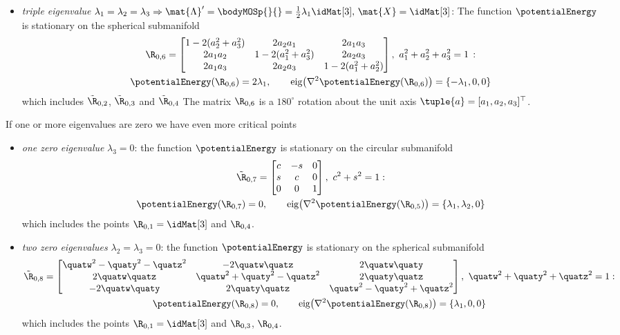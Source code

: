 \begin{Example}
\begin{itemize}
\item \textit{triple eigenvalue} $\lambda_1 = \lambda_2 = \lambda_3 \Rightarrow \mat{\Lambda}' = \bodyMOSp{}{} = \tfrac{1}{2} \lambda_1 \idMat[3], \, \mat{X} = \idMat[3]$:
The function $\potentialEnergy$ is stationary on the spherical submanifold
\begin{multline*}
 \R_{0,6} =
 \begin{bmatrix}
  1 - 2(a_2^2 + a_3^2) & 2 a_2 a_1 & 2 a_1 a_3 \\
  2 a_1 a_2 & 1 - 2(a_1^2 + a_3^2) & 2 a_2 a_3 \\
  2 a_1 a_3 & 2 a_2 a_3 & 1 - 2(a_1^2 + a_2^2) \\
 \end{bmatrix}, \ a_1^2 + a_2^2 + a_3^2 = 1 \, :
\\
 \potentialEnergy(\R_{0,6}) = 2 \lambda_1, 
\qquad
 \text{eig}\big( \nabla^2\potentialEnergy(\R_{0,6}) \big) = \{ -\lambda_1, 0, 0 \}
\end{multline*}
which includes $\tilde{\R}_{0,2}$, $\tilde{\R}_{0,3}$ and $\tilde{\R}_{0,4}$
The matrix $\R_{0,6}$ is a $180^\circ$ rotation about the unit axis $\tuple{a} = [a_1, a_2, a_3]^\top$. 
\end{itemize}
If one or more eigenvalues are zero we have even more critical points
\begin{itemize}
\item \textit{one zero eigenvalue} $\lambda_3 = 0$: the function $\potentialEnergy$ is stationary on the circular submanifold
\begin{multline*}
 \tilde{\R}_{0,7} = \begin{bmatrix} c & -s & 0 \\ s & c & 0 \\ 0 & 0 & 1 \end{bmatrix}, \ c^2 + s^2 = 1:
\\
 \potentialEnergy(\R_{0,7}) = 0,
\qquad
 \text{eig}\big( \nabla^2\potentialEnergy(\R_{0,5}) \big) = \{ \lambda_1, \lambda_2, 0 \}
\end{multline*}
which includes the points $\R_{0,1} = \idMat[3]$ and $\R_{0,4}$.

\item \textit{two zero eigenvalues} $\lambda_2 = \lambda_3 = 0$: the function $\potentialEnergy$ is stationary on the spherical submanifold
\begin{multline*}
 \tilde{\R}_{0,8} = \begin{bmatrix} \quatw^2-\quaty^2-\quatz^2 & -2\quatw\quatz & 2\quatw\quaty \\ 2\quatw\quatz & \quatw^2+\quaty^2-\quatz^2 & 2\quaty\quatz \\ -2\quatw\quaty & 2\quaty\quatz & \quatw^2-\quaty^2+\quatz^2 \end{bmatrix}, \ \quatw^2+\quaty^2+\quatz^2 = 1:
\\
 \potentialEnergy(\R_{0,8}) = 0,
\qquad
 \text{eig}\big( \nabla^2\potentialEnergy(\R_{0,8}) \big) = \{ \lambda_1, 0, 0 \}
\end{multline*}
which includes the points $\R_{0,1} = \idMat[3]$ and $\R_{0,3}$, $\R_{0,4}$.


\end{itemize}
\end{Example}
